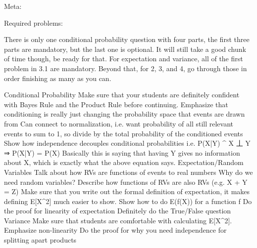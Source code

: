 Meta:
	
Required problems:
	
There is only one conditional probability question with four parts, the first three parts are mandatory, but the last one is optional. It will still take a good chunk of time though, be ready for that.
For expectation and variance, all of the first problem in 3.1 are mandatory. Beyond that, for 2, 3, and 4, go through those in order finishing as many as you can.
	

Conditional Probability
Make sure that your students are definitely confident with Bayes Rule and the Product Rule before continuing. 
Emphasize that conditioning is really just changing the probability space that events are drawn from
Can connect to normalization, i.e. want probability of all still relevant events to sum to 1, so divide by the total probability of the conditioned events 
Show how independence decouples conditional probabilities 
i.e. P(X|Y) ^ X 丄 Y ⇒ P(X|Y) = P(X)
Basically this is saying that having Y gives no information about X, which is exactly what the above equation says.
Expectation/Random Variables
Talk about how RVs are functions of events to real numbers
Why do we need random variables?
Describe how functions of RVs are also RVs (e.g. X + Y = Z)
Make sure that you write out the formal definition of expectation, it makes defining E[X^2] much easier to show.
Show how to do E(f(X)) for a function f
Do the proof for linearity of expectation
Definitely do the True/False question
Variance
Make sure that students are comfortable with calculating E[X^2].
Emphasize non-linearity
Do the proof for why you need independence for splitting apart products

	

